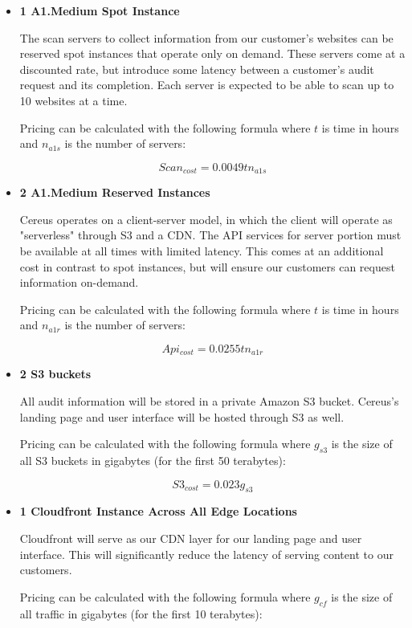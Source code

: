 \begin{itemize}

\item \textbf{1 A1.Medium Spot Instance}

The scan servers to collect information from our customer's websites can be reserved spot instances that operate only on demand. These servers come at a discounted rate, but introduce some latency between a customer's audit request and its completion. Each server is expected to be able to scan up to 10 websites at a time.

Pricing can be calculated with the following formula where \( t \) is time in hours and \( n_{a1s} \) is the number of servers:

\[ Scan_{cost} = 0.0049tn_{a1s} \]

\item \textbf{2 A1.Medium Reserved Instances}

Cereus operates on a client-server model, in which the client will operate as "serverless" through S3 and a CDN. The API services for server portion must be available at all times with limited latency. This comes at an additional cost in contrast to spot instances, but will ensure our customers can request information on-demand. 

Pricing can be calculated with the following formula where \( t \) is time in hours and \( n_{a1r} \) is the number of servers:

\[ Api_{cost} = 0.0255tn_{a1r} \]

\item \textbf{2 S3 buckets}

All audit information will be stored in a private Amazon S3 bucket. Cereus's landing page and user interface will be hosted through S3 as well.

Pricing can be calculated with the following formula where \( g_{s3} \) is the size of all S3 buckets in gigabytes (for the first 50 terabytes):

\[ S3_{cost} = 0.023g_{s3} \]

\item \textbf{1 Cloudfront Instance Across All Edge Locations}

Cloudfront will serve as our CDN layer for our landing page and user interface. This will significantly reduce the latency of serving content to our customers.

Pricing can be calculated with the following formula where \( g_{cf} \) is the size of all traffic in gigabytes (for the first 10 terabytes):


\end{itemize}
